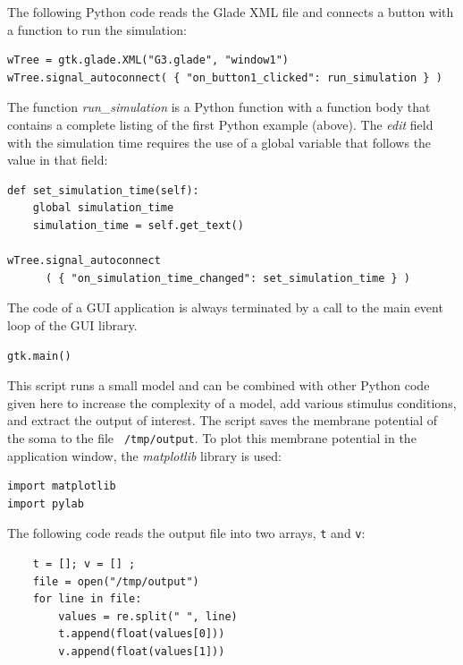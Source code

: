 \documentclass[12pt]{article}
\begin{document}
The following Python code reads the Glade XML file and connects a
button with a function to run the simulation:

{\footnotesize
  \resetlinenumber[5]
  \linenumbers
\begin{verbatim}
wTree = gtk.glade.XML("G3.glade", "window1")
wTree.signal_autoconnect( { "on_button1_clicked": run_simulation } )
\end{verbatim}
}

The function {\it run\_simulation} is a Python function with a
function body that contains a complete listing of the first Python
example (above). The {\it edit} field with the simulation time
requires the use of a global variable that follows the value in that
field:

{\footnotesize
  \resetlinenumber[8]
  \linenumbers
\begin{verbatim}
def set_simulation_time(self):
    global simulation_time
    simulation_time = self.get_text()
    
wTree.signal_autoconnect
      ( { "on_simulation_time_changed": set_simulation_time } )
\end{verbatim}
}

The code of a GUI application is always terminated by a call to the
main event loop of the GUI library.

{\footnotesize
  \resetlinenumber[14]
  \linenumbers
\begin{verbatim}
gtk.main()
\end{verbatim}
}

This script runs a small model and can be combined with other Python
code given here to increase the complexity of a model, add various
stimulus conditions, and extract the output of interest.  The script
saves the membrane potential of the soma to the file {\tt
  /tmp/output}.  To plot this membrane potential in the application
window, the {\it matplotlib} library is used:

{\footnotesize
  \resetlinenumber[5]
\begin{verbatim}
import matplotlib
import pylab
\end{verbatim}
}

The following code reads the output file into two arrays, {\tt t} and
{\tt v}:

{\footnotesize
  \resetlinenumber[5]
\begin{verbatim}
    t = []; v = [] ;
    file = open("/tmp/output")
    for line in file:
        values = re.split(" ", line)
        t.append(float(values[0]))
        v.append(float(values[1]))
\end{verbatim}
}
\end{document}
